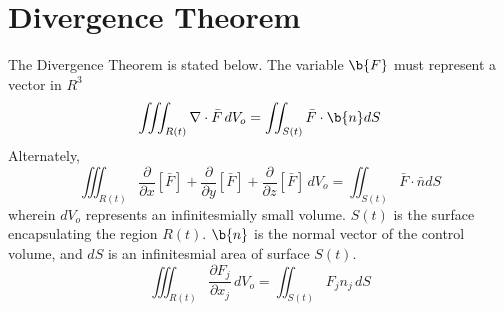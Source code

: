 \chapter{Divergence Theorem}
\begin{comment}
\end{comment}
The Divergence Theorem is stated below. The variable $\b{F}$ must represent a vector in $R^3$
$$\iiint_{R(t)}  \nabla \cdot \bar{F} \,dV_o = \iint_{S(t)}\bar{F} \cdot \b{n}dS$$
Alternately,
$$\iiint_{R(t)}  \frac{\partial}{\partial x}[\bar{F}] + \frac{\partial}{\partial y}[\bar{F}] + \frac{\partial}{\partial z}[\bar{F}] \,dV_o = \iint_{S(t)}\bar{F}\cdot \bar{n}dS$$
wherein $dV_o$ represents an infinitesmially small volume. $S(t)$ is the surface encapsulating the region $R(t)$. $\b{n}$ is the normal vector of the control volume, and $dS$ is an infinitesmial area of surface $S(t)$.
\begin{equation}\iiint^{}_{R(t)} \frac{\partial F_{j}}{\partial x_{j}} \,dV_{o} = \iint^{}_{S(t)} F_{j}n_{j} \,dS \label{Tensor Index Notation Divergence Theorem}\end{equation}



